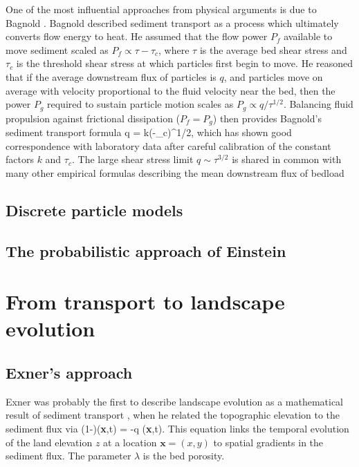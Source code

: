 One of the most influential approaches from physical arguments is due to Bagnold \citep{Bagnold1956,Bagnold1966}.
Bagnold described sediment transport as a process which ultimately converts flow energy to heat.
He assumed that the flow power $P_f$ available to move sediment scaled as $P_f \propto \tau - \tau_c$, where $\tau$ is the average bed shear stress and $\tau_c$ is the threshold shear stress at which particles first begin to move. 
He reasoned that if the average downstream flux of particles is $q$, and particles move on average with velocity proportional to the fluid velocity near the bed, then the power $P_g$ required to sustain particle motion scales as $P_g \propto q/\tau^{1/2}. $ Balancing fluid propulsion against frictional dissipation ($P_f = P_g$) then provides Bagnold's sediment transport formula
\be q = k(\tau-\tau_c)\tau^{1/2}, \label{eq:bagnold}\ee
which has shown good correspondence with laboratory data after careful calibration of the constant factors $k$ and $\tau_c$.
The large shear stress limit $q \sim \tau^{3/2}$ is shared in common with many other empirical formulas describing the mean downstream flux of bedload \citep[e.g.][]{MeyerPeter1948, Yalin1972}

\subsection{Discrete particle models}


\subsection{The probabilistic approach of Einstein}


\section{From transport to landscape evolution}


\subsection{Exner's approach} 

Exner was probably the first to describe landscape evolution as a mathematical result of sediment transport \citep{Exner1925}, when he related the topographic elevation to the sediment flux via
\be (1-\lambda)(\textbf{x},t) = -\nabla q (\textbf{x},t). \ee
This equation links the temporal evolution of the land elevation $z$ at a location $\textbf{x}=(x,y)$ to spatial gradients in the sediment flux. The parameter $\lambda$ is the bed porosity.

